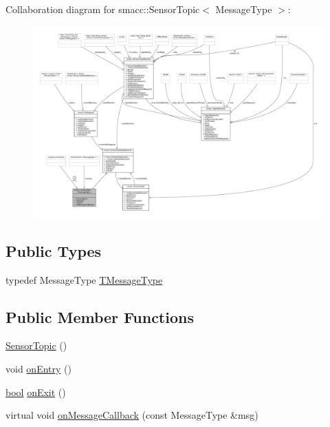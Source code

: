 Collaboration diagram for smacc\+:\+:Sensor\+Topic$<$ Message\+Type $>$\+:
\nopagebreak
\begin{figure}[H]
\begin{center}
\leavevmode
\includegraphics[width=350pt]{classsmacc_1_1SensorTopic__coll__graph}
\end{center}
\end{figure}
\subsection*{Public Types}
\begin{DoxyCompactItemize}
\item 
typedef Message\+Type \hyperlink{classsmacc_1_1SensorTopic_a5ba13cdfe30513184afe37aeaa5bbe88}{T\+Message\+Type}
\end{DoxyCompactItemize}
\subsection*{Public Member Functions}
\begin{DoxyCompactItemize}
\item 
\hyperlink{classsmacc_1_1SensorTopic_a0b58c3efc7254341a8fb7b47605c0096}{Sensor\+Topic} ()
\item 
void \hyperlink{classsmacc_1_1SensorTopic_a27fe3515e3981a5a393dea193902cbd0}{on\+Entry} ()
\item 
\hyperlink{classbool}{bool} \hyperlink{classsmacc_1_1SensorTopic_a563d6288b66605ca99320eab5de9cfba}{on\+Exit} ()
\item 
virtual void \hyperlink{classsmacc_1_1SensorTopic_a1160ef981ab390d75d862a6067615e41}{on\+Message\+Callback} (const Message\+Type \&msg)
\end{DoxyCompactItemize}
